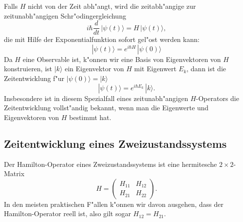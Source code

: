 Falls $H$ nicht von der Zeit abh"angt, wird die zeitabh"angige zur
zeitunabh"angigen Schr"odingergleichung
\begin{equation}
i\hbar \frac{d}{dt}\,|\psi(t)\rangle = H\,|\psi(t)\rangle,
\label{skript:schroedingergleichung}
\end{equation}
die mit Hilfe der Exponentialfunktion sofort gel"ost werden kann:
\[
|\psi(t)\rangle = e^{i\hbar H}\,|\psi(0)\rangle
\]
Da $H$ eine Observable ist, k"onnen wir eine Basis von Eigenvektoren
von $H$ konstruieren, ist $|k\rangle$ ein Eigenvektor von $H$ mit
Eigenwert $E_k$, dann ist die Zeitentwicklung f"ur $|\psi(0)\rangle = |k\rangle$
\[
|\psi(t)\rangle
=
e^{i\hbar E_k}\,|k\rangle.
\]
Insbesondere ist in diesem Spezialfall eines zeitunabh"angigen $H$-Operators
die Zeitentwicklung vollst"andig bekannt, wenn man die Eigenwerte und
Eigenvektoren von $H$ bestimmt hat.

%
%
\subsection{Zeitentwicklung eines Zweizustandssystems}
Der Hamilton-Operator eines Zweizustandssystems ist eine hermitesche
$2\times 2$-Matrix
\[
H=\begin{pmatrix}H_{11}&H_{12}\\H_{21}&H_{22}\end{pmatrix}.
\]
In den meisten praktischen F"allen k"onnen wir davon ausgehen, dass
der Hamilton-Operator reell ist, also gilt sogar $H_{12}=H_{21}$.

